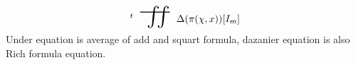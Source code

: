 \documentclass{jsarticle}
\begin{document}
 \newcommand{\whitewithbodercirclevariiint}{%
	 \begin{picture}(30,45)
		 \put(0,0){\scalebox{2.0}[2]{$\whitewithbodercircle$}}
		 \put(0,0){\scalebox{2.0}[2]{$\variiint$}}
	 \end{picture}%
	 }
 
 \newcommand{\average}{%
	  \begin{picture}(30,45)
		  \put(0,0){\scalebox{2.0}[2]{$\square$}}
		  \put(4,4){$\setminus$}
	  \end{picture}%
  } 
 
  \newcommand{\whitewithwhitecircle}
  {\text{\textcircled{\phantom{\textbullet}}}}

 

  \newcommand{\whitewithboder}{%
	  \begin{picture}(15,30)
		  \put(0,0){\scalebox{2.0}[2]{$\square$}}
		  \put(4,4){$\square$}
	  \end{picture}%
  } 
  \newcommand{\whitewithnabla}{%
	  \begin{picture}(15,30)
		  \put(0,0){\scalebox{2.0}[2]{$\nabla$}}
		  \put(3,3){$\nabla$}
	  \end{picture}%
  } 


\newcommand{\timebow}{%
	\begin{picture}(5,5)
		\put(0,0){$\text{\rotatebox{90}{$\bowtie$}}$}
	\end{picture} %
	}


 \newcommand{\flowerletter}{%
	 \begin{picture}(10,20)
		 \put(0,0){$\text{\scalebox{1.0}[1]{$\square$}}$}
		 \put(0,0){$\text{\scalebox{1.0}[2]{$\int$}}$}
	 \end{picture} %
	 }




     $$ {}^{t}\scalebox{2}[2]{\variint}\Delta(\pi(\chi,x))[I_m] $$
     Under equation is average of add and squart formula,
     dazanier equation is also Rich formula equation.
\end{document}
